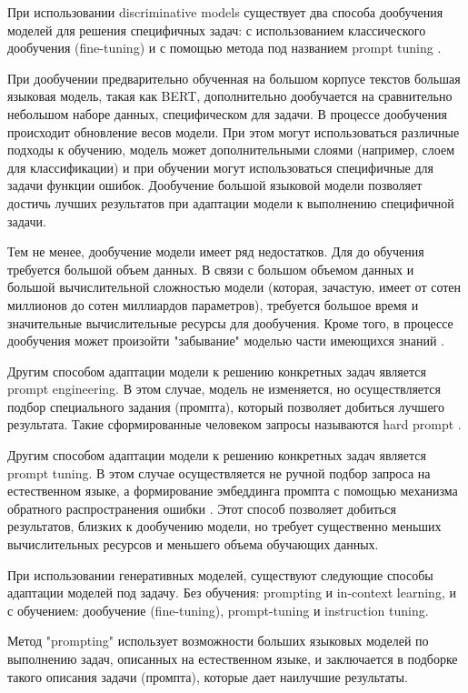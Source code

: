 При использовании discriminative models существует два способа дообучения моделей для решения специфичных задач: с использованием классического дообучения (fine-tuning) и с помощью метода под названием prompt tuning \cite{llm_rs_survey}.

При дообучении предварительно обученная на большом корпусе текстов большая языковая модель, такая как BERT, дополнительно дообучается на сравнительно небольшом наборе данных, специфическом для задачи. В процессе дообучения происходит обновление весов модели. При этом могут использоваться различные подходы к обучению, модель может дополнительными слоями (например, слоем для классификации) и при обучении могут использоваться специфичные для задачи функции ошибок. Дообучение большой языковой модели позволяет достичь лучших результатов при адаптации модели к выполнению специфичной задачи.

Тем не менее, дообучение модели имеет ряд недостатков. Для до обучения требуется большой объем данных. В связи с большом объемом данных и большой вычислительной сложностью модели (которая, зачастую, имеет от сотен миллионов до сотен миллиардов параметров), требуется большое время и значительные вычислительные ресурсы для дообучения. Кроме того, в процессе дообучения может произойти "забывание" моделью части имеющихся знаний \cite{prompt_tuning}.

Другим способом адаптации модели к решению конкретных задач является prompt engineering. В этом случае, модель не изменяется, но осуществляется подбор специального задания (промпта), который позволяет добиться лучшего результата. Такие сформированные человеком запросы называются hard prompt \cite{prompt_tuning}.

Другим способом адаптации модели к решению конкретных задач является prompt tuning. В этом случае осуществляется не ручной подбор запроса на естественном языке, а формирование эмбеддинга промпта с помощью механизма обратного распространения ошибки \cite{prompt_tuning}.  Этот способ позволяет добиться результатов, близких к дообучению модели, но требует существенно меньших вычислительных ресурсов и меньшего объема обучающих данных.

При использовании генеративных моделей, существуют следующие способы адаптации моделей под задачу. Без обучения: prompting и in-context learning, и с обучением: дообучение (fine-tuning), prompt-tuning и instruction tuning.

Метод "prompting" использует возможности больших языковых моделей по выполнению задач, описанных на естественном языке, и заключается в подборке такого описания задачи (промпта), которые дает наилучшие результаты.

